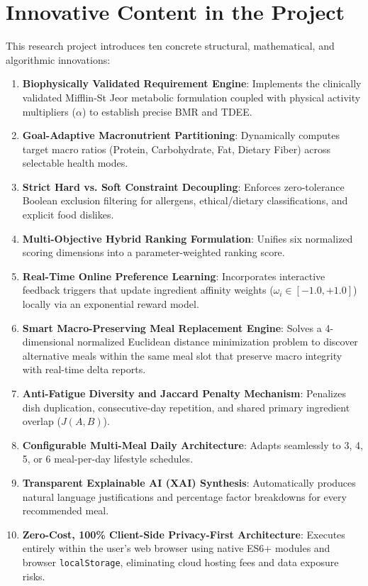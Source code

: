 \documentclass[12pt,a4paper]{report}
\begin{document}
\section{Innovative Content in the Project}
This research project introduces ten concrete structural, mathematical, and algorithmic innovations:
\begin{enumerate}
    \item \textbf{Biophysically Validated Requirement Engine}: Implements the clinically validated Mifflin-St Jeor metabolic formulation coupled with physical activity multipliers ($\alpha$) to establish precise BMR and TDEE.
    \item \textbf{Goal-Adaptive Macronutrient Partitioning}: Dynamically computes target macro ratios (Protein, Carbohydrate, Fat, Dietary Fiber) across selectable health modes.
    \item \textbf{Strict Hard vs. Soft Constraint Decoupling}: Enforces zero-tolerance Boolean exclusion filtering for allergens, ethical/dietary classifications, and explicit food dislikes.
    \item \textbf{Multi-Objective Hybrid Ranking Formulation}: Unifies six normalized scoring dimensions into a parameter-weighted ranking score.
    \item \textbf{Real-Time Online Preference Learning}: Incorporates interactive feedback triggers that update ingredient affinity weights ($\omega_i \in [-1.0, +1.0]$) locally via an exponential reward model.
    \item \textbf{Smart Macro-Preserving Meal Replacement Engine}: Solves a 4-dimensional normalized Euclidean distance minimization problem to discover alternative meals within the same meal slot that preserve macro integrity with real-time delta reports.
    \item \textbf{Anti-Fatigue Diversity and Jaccard Penalty Mechanism}: Penalizes dish duplication, consecutive-day repetition, and shared primary ingredient overlap ($J(A,B)$).
    \item \textbf{Configurable Multi-Meal Daily Architecture}: Adapts seamlessly to 3, 4, 5, or 6 meal-per-day lifestyle schedules.
    \item \textbf{Transparent Explainable AI (XAI) Synthesis}: Automatically produces natural language justifications and percentage factor breakdowns for every recommended meal.
    \item \textbf{Zero-Cost, 100\% Client-Side Privacy-First Architecture}: Executes entirely within the user's web browser using native ES6+ modules and browser \texttt{localStorage}, eliminating cloud hosting fees and data exposure risks.
\end{enumerate}
\end{document}

